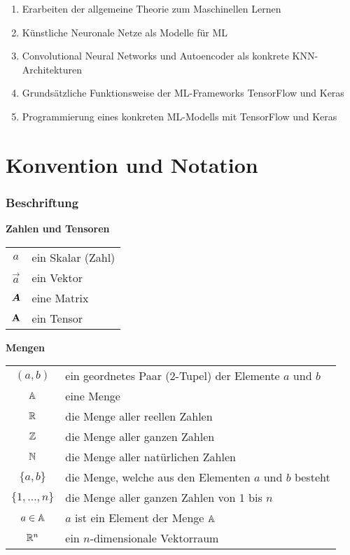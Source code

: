 \begin{enumerate}
  \item{Erarbeiten der allgemeine Theorie zum Maschinellen Lernen}
  \item{Künstliche Neuronale Netze als Modelle für ML}
  \item{Convolutional Neural Networks und Autoencoder als konkrete KNN-Architekturen}
  \item{Grundsätzliche Funktionsweise der ML-Frameworks TensorFlow und Keras}
  \item{Programmierung eines konkreten ML-Modells mit TensorFlow und Keras}
\end{enumerate}



\chapter*{Konvention und Notation}

\subsection*{Beschriftung}

\begin{center}\textbf{Zahlen und Tensoren}\end{center}
\begin{tabular}{cl}
  $a$ & ein Skalar (Zahl) \\
  $\vec{a}$ & ein Vektor \\
  $\bm{A}$ & eine Matrix \\
  $\mathbf{A}$ & ein Tensor \\

\end{tabular}

\begin{center}\textbf{Mengen}\end{center}
\begin{tabular}{cl}
  $(a,b)$ & ein geordnetes Paar (2-Tupel) der Elemente $a$ und $b$ \\
  $\mathbb{A}$ & eine Menge \\
  $\mathbb{R}$ & die Menge aller reellen Zahlen \\
  $\mathbb{Z}$ & die Menge aller ganzen Zahlen \\
  $\mathbb{N}$ & die Menge aller natürlichen Zahlen \\
  $\{a,b\}$ & die Menge, welche aus den Elementen $a$ und $b$ besteht \\
  $\{1,\ldots,n\}$ & die Menge aller ganzen Zahlen von 1 bis $n$ \\
  $a \in \mathbb{A}$ & $a$ ist ein Element der Menge $\mathbb{A}$ \\
  $\mathbb{R}^n$ & ein $n$-dimensionale Vektorraum \\
\end{tabular}

